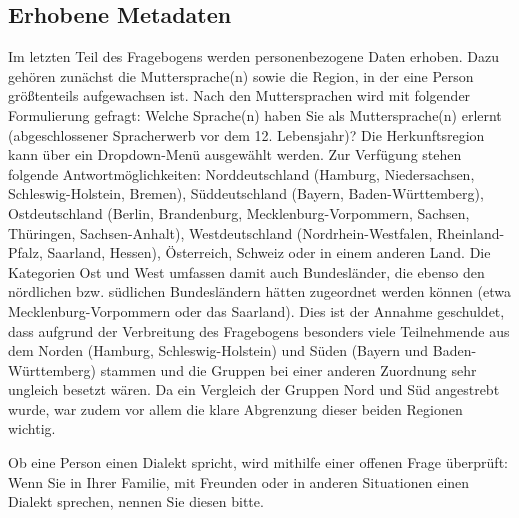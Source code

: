 \subsection{Erhobene Metadaten}
\label{sec:ME}
\largerpage
\begin{sloppypar}
Im letzten Teil des Fragebogens werden personenbezogene Daten erhoben. Dazu gehören zunächst die Muttersprache(n) sowie die Region, in der eine Person größtenteils aufgewachsen ist. 
Nach den Muttersprachen wird mit folgender Formulierung gefragt: \glqq Welche Sprache(n) haben Sie als Muttersprache(n) erlernt (abgeschlossener Spracherwerb vor dem 12. Lebensjahr)?\grqq{} Die Herkunftsregion kann über ein Dropdown-Menü ausgewählt werden. Zur Verfügung stehen folgende Antwortmöglichkeiten: \glqq Norddeutschland (Hamburg, Niedersachsen, Schleswig\hyp Holstein, Bremen)\grqq, \glqq Süddeutschland (Bayern, Baden\hyp Württemberg)\grqq, \glqq Ostdeutschland (Berlin, Brandenburg, Mecklenburg\hyp Vorpommern, Sachsen, Thüringen, Sachsen\hyp Anhalt)\grqq, \glqq Westdeutschland (Nordrhein\hyp Westfalen, Rheinland\hyp Pfalz, Saarland, Hessen)\grqq, \glqq Österreich\grqq, \glqq Schweiz\grqq{} oder \glqq in einem anderen Land\grqq. 
Die Kategorien Ost und West umfassen damit auch Bundesländer, die ebenso den nördlichen bzw. südlichen Bundesländern hätten zugeordnet werden können (etwa Mecklenburg-Vorpommern oder das Saarland). 
Dies ist der Annahme geschuldet, dass aufgrund der Verbreitung des Fragebogens besonders viele Teilnehmende aus dem Norden (Hamburg, Schleswig-Holstein) und Süden (Bayern und Baden-Württemberg) stammen und die Gruppen bei einer anderen Zuordnung sehr ungleich besetzt wären.
Da ein Vergleich der Gruppen Nord und Süd angestrebt wurde, war zudem vor allem die klare Abgrenzung dieser beiden Regionen wichtig. 
\end{sloppypar}

Ob eine Person einen Dialekt spricht, wird mithilfe einer offenen Frage überprüft: \glqq Wenn Sie in Ihrer Familie, mit Freunden oder in anderen Situationen einen Dialekt sprechen, nennen Sie diesen bitte.\grqq{} %

